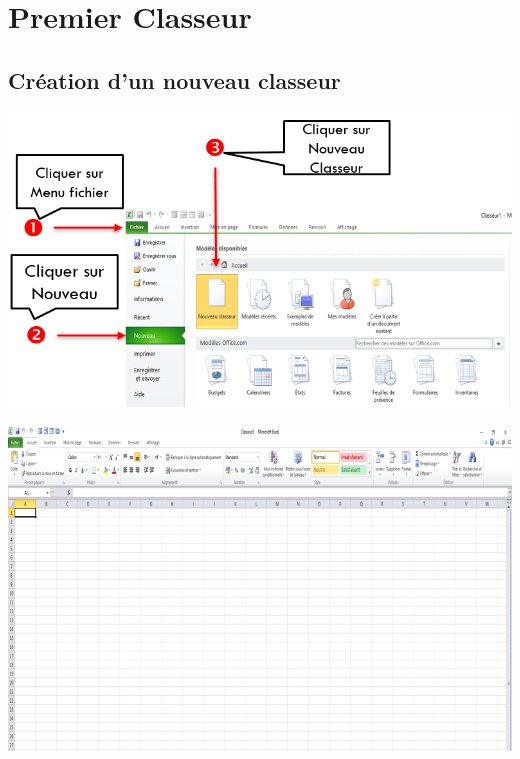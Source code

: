 \chapter{Premier Classeur}
\section{Création d’un nouveau classeur}
 \begin{center} 
	\includegraphics[scale=0.2,width=\linewidth]{img/nouveau_classeur} 
\end{center}
 \begin{center} 
	\includegraphics[scale=0.2,width=\linewidth]{img/classeur} 
\end{center}
